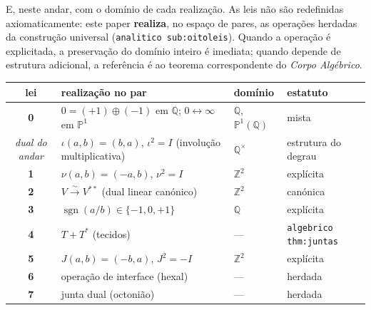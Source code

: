 \documentclass[11pt,a4paper]{article}
\newcommand{\code}[1]{\texttt{\small #1}}
\begin{document}

\noindent E, neste andar, com o domínio de cada realização.
As leis não são redefinidas axiomaticamente: este paper \textbf{realiza}, no
espaço de pares, as operações herdadas da construção universal
(\code{analitico sub:oitoleis}). Quando a operação é explicitada, a preservação
do domínio inteiro é imediata; quando depende de estrutura adicional, a
referência é ao teorema correspondente do \emph{Corpo Algébrico}.

\begin{center}\small
\begin{tabular}{@{}clll@{}}
\toprule
lei & realização no par & domínio & estatuto \\
\midrule
\textbf{0} & $0=(+1)\oplus(-1)$ em $\mathbb{Q}$; $0\leftrightarrow\infty$ em $\mathbb{P}^{1}$ &
  $\mathbb{Q}$, $\mathbb{P}^{1}(\mathbb{Q})$ & mista \\
\textit{dual do andar} & $\iota(a,b)=(b,a)$, $\iota^{2}=I$ (involução multiplicativa) &
  $\mathbb{Q}^{\times}$ & estrutura do degrau \\
\textbf{1} & $\nu(a,b)=(-a,b)$, $\nu^{2}=I$ & $\mathbb{Z}^{2}$ & explícita \\
\textbf{2} & $V\xrightarrow{\sim} V^{**}$ (dual linear canónico) & $\mathbb{Z}^{2}$ & canónica \\
\textbf{3} & $\operatorname{sgn}(a/b)\in\{-1,0,+1\}$ & $\mathbb{Q}$ & explícita \\
\textbf{4} & $T+T^{*}$ (tecidos) & --- & \code{algebrico thm:juntas} \\
\textbf{5} & $J(a,b)=(-b,a)$, $J^{2}=-I$ & $\mathbb{Z}^{2}$ & explícita \\
\textbf{6} & operação de interface (hexal) & --- & herdada \\
\textbf{7} & junta dual (octonião) & --- & herdada \\
\bottomrule
\end{tabular}
\end{center}
\end{document}
